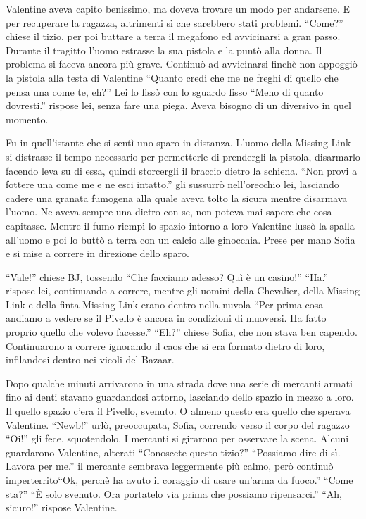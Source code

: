     Valentine aveva capito benissimo, ma doveva trovare un modo per andarsene. E per recuperare la ragazza, altrimenti
    sì che sarebbero stati problemi. ``Come?'' chiese il tizio, per poi buttare a terra il megafono ed avvicinarsi a
    gran passo. Durante il tragitto l'uomo estrasse la sua pistola e la puntò alla donna. Il problema si faceva ancora
    più grave. Continuò ad avvicinarsi finchè non appoggiò la pistola alla testa di Valentine ``Quanto credi che me ne
    freghi di quello che pensa una come te, eh?'' Lei lo fissò con lo sguardo fisso ``Meno di quanto dovresti.'' rispose
    lei, senza fare una piega. Aveva bisogno di un diversivo in quel momento.

    Fu in quell'istante che si sentì uno sparo in distanza. L'uomo della Missing Link si distrasse il tempo necessario
    per permetterle di prendergli la pistola, disarmarlo facendo leva su di essa, quindi storcergli il braccio dietro la
    schiena. ``Non provi a fottere una come me e ne esci intatto.'' gli sussurrò nell'orecchio lei, lasciando cadere una
    granata fumogena alla quale aveva tolto la sicura mentre disarmava l'uomo. Ne aveva sempre una dietro con se, non
    poteva mai sapere che cosa capitasse. Mentre il fumo riempì lo spazio intorno a loro Valentine lussò la spalla
    all'uomo e poi lo buttò a terra con un calcio alle ginocchia. Prese per mano Sofia e si mise a correre in direzione
    dello sparo.

    ``Vale!'' chiese BJ, tossendo ``Che facciamo adesso? Quì è un casino!'' ``Ha.'' rispose lei, continuando a correre,
    mentre gli uomini della Chevalier, della Missing Link e della finta Missing Link erano dentro nella nuvola ``Per
    prima cosa andiamo a vedere se il Pivello è ancora in condizioni di muoversi. Ha fatto proprio quello che volevo
    facesse.'' ``Eh?'' chiese Sofia, che non stava ben capendo. Continuarono a correre ignorando il caos che si era
    formato dietro di loro, infilandosi dentro nei vicoli del Bazaar.

    Dopo qualche minuti arrivarono in una strada dove una serie di mercanti armati fino ai denti stavano guardandosi
    attorno, lasciando dello spazio in mezzo a loro. Il quello spazio c'era il Pivello, svenuto. O almeno questo era
    quello che sperava Valentine. ``Newb!'' urlò, preoccupata, Sofia, correndo verso il corpo del ragazzo ``Oi!'' gli
    fece, squotendolo. I mercanti si girarono per osservare la scena. Alcuni guardarono Valentine, alterati ``Conoscete
    questo tizio?'' ``Possiamo dire di sì. Lavora per me.'' il mercante sembrava leggermente più calmo, però continuò
    imperterrito``Ok, perchè ha avuto il coraggio di usare un'arma da fuoco.'' ``Come sta?'' ``È solo svenuto. Ora
    portatelo via prima che possiamo ripensarci.'' ``Ah, sicuro!'' rispose Valentine.

